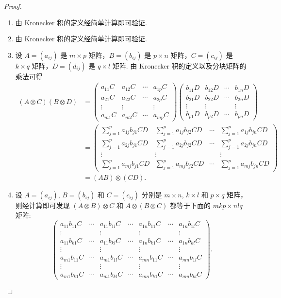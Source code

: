\documentclass[../../main.tex]{subfiles}
\begin{document}
\begin{proof}
\begin{enumerate}[(1)]
\item 由 Kronecker 积的定义经简单计算即可验证.

\item 由 Kronecker 积的定义经简单计算即可验证.

\item 设 $A=(a_{ij})$ 是 $m\times p$ 矩阵，$B=(b_{ij})$ 是 $p\times n$ 矩阵，$C=(c_{ij})$ 是 $k\times q$ 矩阵，$D=(d_{ij})$ 是 $q\times l$ 矩阵. 由 Kronecker 积的定义以及分块矩阵的乘法可得
\begin{align*}
(A\otimes C)(B\otimes D)&=
\begin{pmatrix}
a_{11}C & a_{12}C & \cdots & a_{1p}C \\
a_{21}C & a_{22}C & \cdots & a_{2p}C \\
\vdots & \vdots & & \vdots \\
a_{m1}C & a_{m2}C & \cdots & a_{mp}C
\end{pmatrix}
\begin{pmatrix}
b_{11}D & b_{12}D & \cdots & b_{1n}D \\
b_{21}D & b_{22}D & \cdots & b_{2n}D \\
\vdots & \vdots & & \vdots \\
b_{p1}D & b_{p2}D & \cdots & b_{pn}D
\end{pmatrix}\\
&=
\begin{pmatrix}
\sum_{j = 1}^{p}a_{1j}b_{j1}CD & \sum_{j = 1}^{p}a_{1j}b_{j2}CD & \cdots & \sum_{j = 1}^{p}a_{1j}b_{jn}CD \\
\sum_{j = 1}^{p}a_{2j}b_{j1}CD & \sum_{j = 1}^{p}a_{2j}b_{j2}CD & \cdots & \sum_{j = 1}^{p}a_{2j}b_{jn}CD \\
\vdots & \vdots & & \vdots \\
\sum_{j = 1}^{p}a_{mj}b_{j1}CD & \sum_{j = 1}^{p}a_{mj}b_{j2}CD & \cdots & \sum_{j = 1}^{p}a_{mj}b_{jn}CD
\end{pmatrix}\\
&=(AB)\otimes (CD).
\end{align*}

\item 设 $A=(a_{ij})$, $B=(b_{ij})$ 和 $C=(c_{ij})$ 分别是 $m\times n$, $k\times l$ 和 $p\times q$ 矩阵，则经计算即可发现 $(A\otimes B)\otimes C$ 和 $A\otimes (B\otimes C)$ 都等于下面的 $mkp\times nlq$ 矩阵:
\[
\begin{pmatrix}
a_{11}b_{11}C & \cdots & a_{11}b_{1l}C & \cdots & a_{1n}b_{11}C & \cdots & a_{1n}b_{1l}C \\
\vdots & & \vdots & & \vdots & & \vdots \\
a_{11}b_{k1}C & \cdots & a_{11}b_{kl}C & \cdots & a_{1n}b_{k1}C & \cdots & a_{1n}b_{kl}C \\
\vdots & & \vdots & & \vdots & & \vdots \\
a_{m1}b_{11}C & \cdots & a_{m1}b_{1l}C & \cdots & a_{mn}b_{11}C & \cdots & a_{mn}b_{1l}C \\
\vdots & & \vdots & & \vdots & & \vdots \\
a_{m1}b_{k1}C & \cdots & a_{m1}b_{kl}C & \cdots & a_{mn}b_{k1}C & \cdots & a_{mn}b_{kl}C
\end{pmatrix}.
\]


\end{enumerate}
\end{proof}
\end{document}
